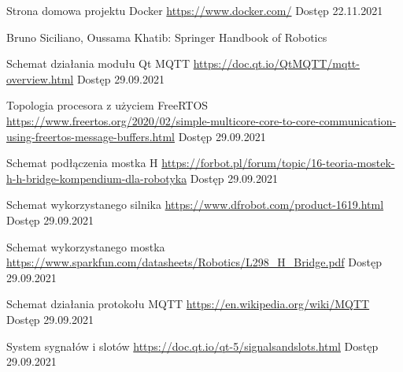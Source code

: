\begin{thebibliography}{9}
        Strona domowa projektu Docker \newline
        \url{https://www.docker.com/}
        Dostęp 22.11.2021  
        
        Bruno Siciliano, Oussama Khatib: Springer Handbook of Robotics
        
        
        Schemat działania modułu Qt MQTT  \newline
        \url{https://doc.qt.io/QtMQTT/mqtt-overview.html} \newline
        Dostęp 29.09.2021        
         
        Topologia procesora z użyciem FreeRTOS  \newline
        \url{https://www.freertos.org/2020/02/simple-multicore-core-to-core-communication-using-freertos-message-buffers.html} \newline
        Dostęp 29.09.2021     
        
        Schemat podłączenia mostka H  \newline
        \url{https://forbot.pl/forum/topic/16-teoria-mostek-h-h-bridge-kompendium-dla-robotyka} \newline
        Dostęp 29.09.2021         
        
        Schemat wykorzystanego silnika  \newline
        \url{https://www.dfrobot.com/product-1619.html} \newline
        Dostęp 29.09.2021
                
        Schemat wykorzystanego mostka  \newline
        \url{https://www.sparkfun.com/datasheets/Robotics/L298_H_Bridge.pdf} \newline
        Dostęp 29.09.2021
        
        Schemat działania protokołu MQTT  \newline
        \url{https://en.wikipedia.org/wiki/MQTT} \newline
        Dostęp 29.09.2021
        
        System sygnałów i slotów \newline
        \url{https://doc.qt.io/qt-5/signalsandslots.html} \newline
        Dostęp 29.09.2021
        

\end{thebibliography}
